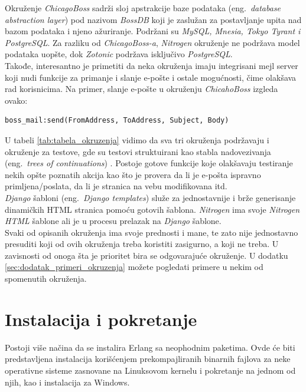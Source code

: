 \documentclass[a4paper]{article}
\begin{document}
{Okruženje {\em ChicagoBoss} sadrži sloj apstrakcije baze podataka (eng.~{\em database abstraction layer}) pod nazivom {\em BossDB} \cite{ChicagoBossDocumentation} koji je zaslužan za postavljanje upita nad bazom podataka i njeno ažuriranje. 
Podržani su {\em MySQL, Mnesia, Tokyo Tyrant i PostgreSQL}. 
Za razliku od {\em ChicagoBoss-a}, {\em Nitrogen} okruženje ne podržava model podataka uopšte, dok {\em Zotonic} \cite{ZotonicDocumentation} podržava isključivo {\em PostgreSQL}.\\

Takođe, interesantno je primetiti da neka okruženja imaju integrisani mejl server koji nudi funkcije za primanje i slanje e-pošte i ostale mogućnosti, 
čime olakšava rad korisnicima. 
Na primer, slanje e-pošte u okruženju {\em ChicahoBoss} izgleda ovako:

\begin{verbatim}
boss_mail:send(FromAddress, ToAddress, Subject, Body)
\end{verbatim} 

U tabeli \ref{tab:tabela_okruzenja} vidimo da sva tri okruženja podržavaju i okruženje za testove, gde su testovi struktuirani kao stabla nadovezivanja (eng.~{\em trees of continuations}) \cite{EvanMillerTesting}. 
Postoje gotove funkcije koje olakšavaju testiranje nekih opšte poznatih akcija kao što je provera da li je e-pošta ispravno primljena/poslata, da li je stranica na vebu modifikovana itd. \\

{\em Django} šabloni (eng.~{\em Django templates}) \cite{DjangoTempDoc} služe za jednostavnije i brže generisanje dinamičkih HTML stranica pomoću gotovih šablona.
 {\em Nitrogen} ima svoje {\em Nitrogen HTML} šablone ali je u procesu prelazak na {\em Django} šablone.\\
 
Svaki od opisanih okruženja ima svoje prednosti i mane, te zato nije jednostavno presuditi koji od ovih okruženja treba koristiti zasigurno, a koji ne treba. U zavisnosti od onoga šta je prioritet bira se odgovarajuće okruženje. U dodatku \ref{sec:dodatak_primeri_okruzenja} možete pogledati primere u nekim od spomenutih okruženja.

\section{Instalacija i pokretanje}
\label{sec:instalacija}
Postoji više načina da se instalira Erlang sa neophodnim paketima.
Ovde će biti predstavljena instalacija korišćenjem prekompajliranih binarnih fajlova 
za neke operativne sisteme zasnovane na Linuksovom kernelu i pokretanje na jednom od njih, kao i instalacija za Windows.


}
\end{document}
